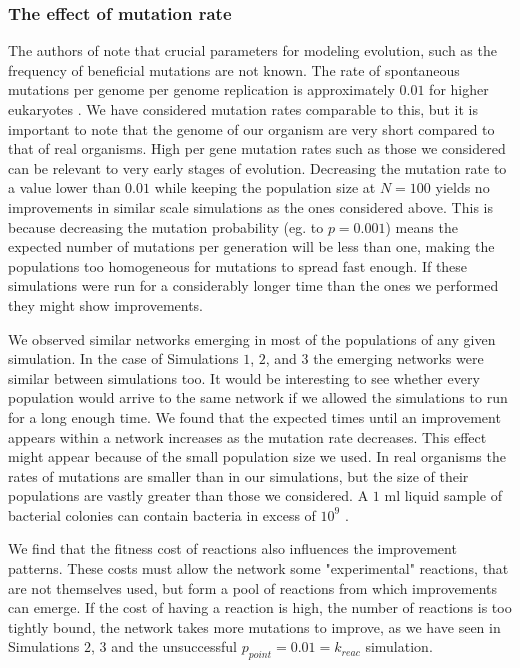 \documentclass[a4paper,12pt]{article}
\begin{document}
\subsubsection*{The effect of mutation rate}
\label{sub:on_the_effect_of_the_probability_of_mutation}


The authors of \cite{predictability} note that crucial parameters for modeling evolution, such as the frequency of beneficial mutations are not known. The rate of spontaneous mutations per genome per genome replication is approximately $0.01$ for higher eukaryotes \cite{mutationrate}. We have considered mutation rates comparable to this, but it is important to note that the genome of our organism are very short compared to that of real organisms. High per gene mutation rates such as those we considered can be relevant to very early stages of evolution. Decreasing the mutation rate to a value lower than $0.01$ while keeping the population size at $N=100$ yields no improvements in similar scale simulations as the ones considered above. This is because decreasing the mutation probability (eg. to $p=0.001$) means the expected number of mutations per generation will be less than one, making the populations too homogeneous for mutations to spread fast enough. If these simulations were run for a considerably longer time than the ones we performed they might show improvements. 

We observed similar networks emerging in most of the populations of any given simulation. In the case of Simulations $1$, $2$, and $3$ the emerging networks were similar between simulations too. It would be interesting to see whether every population would arrive to the same network if we allowed the simulations to run for a long enough time. We found that the expected times until an improvement appears within a network increases as the mutation rate decreases. This effect might appear because of the small population size we used. In real organisms the rates of mutations are smaller than in our simulations, but the size of their populations are vastly greater than those we considered. A $1$ ml liquid sample of bacterial colonies can contain bacteria in excess of $10^9$ \cite{barteklecture}.

We find that the fitness cost of reactions also influences the improvement patterns. These costs must allow the network some "experimental" reactions, that are not themselves used, but form a pool of reactions from which improvements can emerge. If the cost of having a reaction is high, the number of reactions is too tightly bound, the network takes more mutations to improve, as we have seen in Simulations $2$, $3$ and the unsuccessful $p_{point}=0.01=k_{reac}$ simulation.
\end{document}
